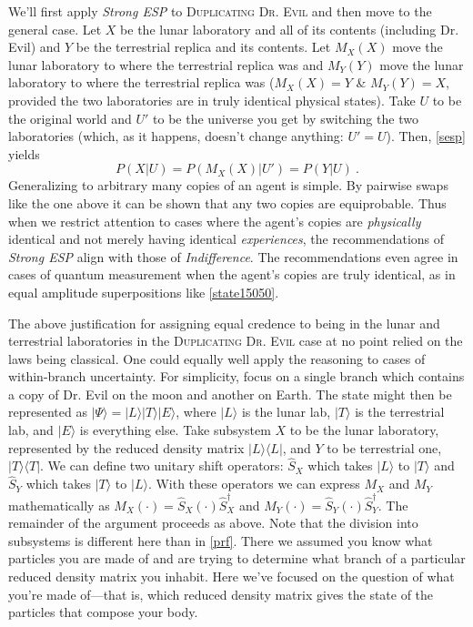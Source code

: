\documentclass[12pt,onecolumn,secnumarabic,amsmath,amssymb,balancelastpage,nofootinbib]{article}
\begin{document}
We'll first apply \emph{Strong ESP} to \textsc{Duplicating Dr. Evil} and then move to the general case.  Let $X$ be the lunar laboratory and all of its contents (including Dr. Evil) and $Y$ be the terrestrial replica and its contents.  Let $M_X(X)$ move the lunar laboratory to where the terrestrial replica was and $M_Y(Y)$ move the lunar laboratory to where the terrestrial replica was ($M_X(X)=Y$ \& $M_Y(Y)=X$, provided the two laboratories are in truly identical physical states).  Take $U$ to be the original world and $U'$ to be the universe you get by switching the two laboratories (which, as it happens, doesn't change anything: $U'=U$).  Then, \eqref{sesp} yields
\begin{equation}
P(X|U)=P(M_X(X)|U')=P(Y|U)\ .
\end{equation}
Generalizing to arbitrary many copies of an agent is simple.  By pairwise swaps like the one above it can be shown that any two copies are equiprobable.  Thus when we restrict attention to cases where the agent's copies are \emph{physically} identical and not merely having identical \emph{experiences}, the recommendations of \emph{Strong ESP} align with those of \emph{Indifference}.  The recommendations even agree in cases of quantum measurement when the agent's copies are truly identical, as in equal amplitude superpositions like \eqref{state15050}.

The above justification for assigning equal credence to being in the lunar and terrestrial laboratories in the \textsc{Duplicating Dr. Evil} case at no point relied on the laws being classical.  One could equally well apply the reasoning to cases of within-branch uncertainty.  For simplicity, focus on a single branch which contains a copy of Dr. Evil on the moon and another on Earth.  The state might then be represented as $|\Psi\rangle=|L\rangle |T\rangle |E\rangle$, where $|L\rangle$ is the lunar lab, $|T\rangle$ is the terrestrial lab, and $|E\rangle$ is everything else.  Take subsystem $X$ to be the lunar laboratory, represented by the reduced density matrix $|L\rangle\langle L |$, and $Y$ to be terrestrial one, $|T\rangle\langle T |$.  We can define two unitary shift operators: $\widehat{S}_X$ which takes $|L\rangle$ to $|T\rangle$ and $\widehat{S}_Y$ which takes $|T\rangle$ to $|L\rangle$.  With these operators we can express $M_X$ and $M_Y$ mathematically as $M_X(\cdot)=\widehat{S}_X(\cdot)\widehat{S}^\dagger_X$ and $M_Y(\cdot)=\widehat{S}_Y(\cdot)\widehat{S}^\dagger_Y$.  The remainder of the argument proceeds as above.  Note that the division into subsystems is different here than in \textsection \ref{prf}.  There we assumed you know what particles you are made of and are trying to determine what branch of a particular reduced density matrix you inhabit.  Here we've focused on the question of what you're made of---that is, which reduced density matrix gives the state of the particles that compose your body.
\end{document}
